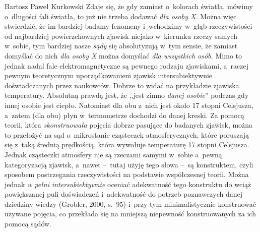 \begin{artplenv}{Bartosz Paweł Kurkowski}
Zdaje się, że gdy zamiast o~kolorach światła, mówimy o~długości fali światła, to już nie trzeba dodawać \textit{dla
osoby X.} Można więc stwierdzić, że im bardziej badamy fenomeny i~wchodzimy w~głąb rzeczywistości od najbardziej
powierzchownych zjawisk niejako w~kierunku rzeczy samych w~sobie, tym bardziej nasze \textit{sądy} się
absolutyzują w~tym sensie, że zamiast  domyślać do nich \textit{dla osoby X} można domyślać \textit{dla wszystkich osób.}
Mimo to jednak nadal fale elektromagnetyczne są pewnego rodzaju zjawiskami, a~raczej pewnym teoretycznym
uporządkowaniem zjawisk intersubiektywnie doświadczanych przez naukowców. Dobrze to widać na przykładzie zjawiska
temperatury. Absolutną prawdą jest, że ,,jest zimno \textit{danej osobie}'' podczas gdy innej osobie jest ciepło.
Natomiast dla obu z~nich jest około 17 stopni Celsjusza, a~zatem (dla obu) płyn w~termometrze dochodzi do danej kreski.
Za pomocą teorii, która \textit{skonstruowała} pojęcia dobrze pasujące do badanych zjawisk, można to przełożyć
na sąd o~mikrostanie cząsteczek atmosferycznych, które poruszają się z~taką średnią prędkością, która wywołuje
temperaturę 17 stopni Celsjusza. Jednak cząsteczki atmosfery nie są rzeczami samymi w~sobie a~pewną kategoryzacją
zjawisk, a~nawet --~tutaj użyję tego słowa --~są konstruktem, czyli sposobem postrzegania rzeczywistości na
podstawie współczesnej teorii.
Można jednak \textit{w pełni intersubiektywnie }oceniać adekwatność tego konstruktu do wciąż powiększanej puli
doświadczeń i~adekwatność do potrzeb poznawczych danej dziedziny wiedzy \label{ref:RNDwpnTa67UZh}(Grobler, 2000, s.~95)
i~przy tym minimalistycznie konstruować używane pojęcia, co przekłada się na mniejszą niepewność konstruowanych za ich
pomocą sądów.



\end{artplenv}

